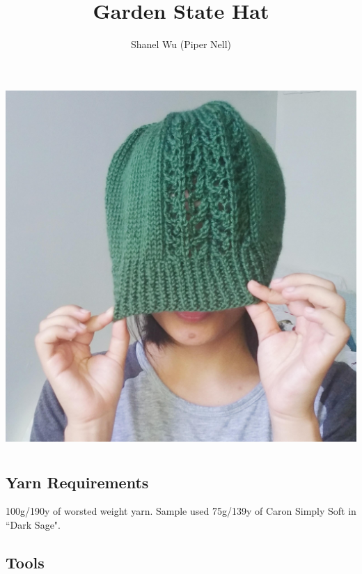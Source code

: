 \documentclass[12pt]{article}
\title{Garden State Hat}
\author{Shanel Wu (Piper Nell)}
\begin{document}
\begin{titlingpage}
\begin{multicols}{2}

\includegraphics[width=\linewidth]{pullover.jpg}

\section*{\thetitle}
\vspace{-0.5em}
\subsubsection*{\theauthor}

\subsection*{Yarn Requirements}


100g/190y of worsted weight yarn. Sample used 75g/139y of Caron Simply Soft in ``Dark Sage".

\vspace{-1em}
\subsection*{Tools} \vspace{-.5em}


\end{multicols}
\end{titlingpage}
\end{document}
